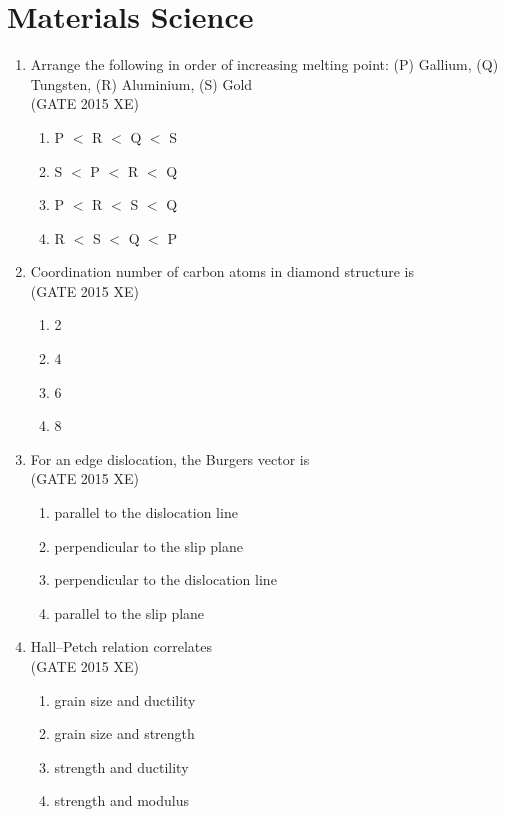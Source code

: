 \documentclass[journal,12pt,onecolumn]{IEEEtran}
\begin{document}
\section*{Materials Science}
\bigskip

\begin{enumerate}


\item Arrange the following in order of increasing melting point:  
(P) Gallium, (Q) Tungsten, (R) Aluminium, (S) Gold  \\
\hfill{(GATE 2015 XE)} 
\begin{multicols}{4}
\begin{enumerate}
\item P $<$ R $<$ Q $<$ S
\item S $<$ P $<$ R $<$ Q
\item P $<$ R $<$ S $<$ Q
\item R $<$ S $<$ Q $<$ P
\end{enumerate}
\end{multicols}

\item Coordination number of carbon atoms in diamond structure is  \\
\hfill{(GATE 2015 XE)} 
\begin{multicols}{4}
\begin{enumerate}
\item 2
\item 4
\item 6
\item 8
\end{enumerate}
\end{multicols}
\item For an edge dislocation, the Burgers vector is  \\
\hfill{(GATE 2015 XE)} 
\begin{multicols}{2}
\begin{enumerate}
\item parallel to the dislocation line
\item perpendicular to the slip plane
\item perpendicular to the dislocation line
\item parallel to the slip plane
\end{enumerate}
\end{multicols}

\item Hall–Petch relation correlates  \\
\hfill{(GATE 2015 XE)} 
\begin{multicols}{2}
\begin{enumerate}
\item grain size and ductility
\item grain size and strength
\item strength and ductility
\item strength and modulus
\end{enumerate}
\end{multicols}


\end{enumerate}
\end{document}
